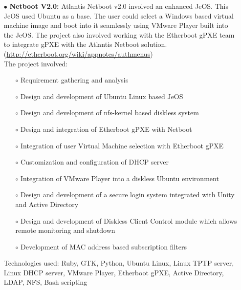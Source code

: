 \documentclass{scrartcl}
\begin{document}
\begin{cv}{
\href{http://www.develmj.com}{}
}
{\begin{itemize}
{\begin{itemize}
  \item[\footnotesize$\circ$] Customization of the JeOS to work with non-standard client devices
  \item[\footnotesize$\circ$] Design and development of a secure login into the Netboot JeOS
    integrated to use Unity credentials
  \end{itemize}}
  Technologies used: Python, GTK, Linux DHCP server, Knoppix Linux, Qemu,
  Bash scripting
\item[\footnotesize$\bullet$] \textbf{Netboot V2.0:} Atlantis Netboot v2.0 involved an enhanced JeOS. This JeOS
used Ubuntu as a base. The user could select a Windows based virtual
machine image and boot into it seamlessly using VMware Player built into the
JeOS. The project also involved working with the Etherboot gPXE team to
integrate gPXE with the Atlantis Netboot solution.
\\(\url{http://etherboot.org/wiki/appnotes/authmenus})\\
The project involved:
{\scriptsize
  \begin{itemize}
  \item[\footnotesize$\circ$] Requirement gathering and analysis
  \item[\footnotesize$\circ$] Design and development of Ubuntu Linux based JeOS
  \item[\footnotesize$\circ$] Design and development of nfs-kernel based diskless system
  \item[\footnotesize$\circ$] Design and integration of Etherboot gPXE with Netboot
  \item[\footnotesize$\circ$] Integration of user Virtual Machine selection with Etherboot gPXE
  \item[\footnotesize$\circ$] Customization and configuration of DHCP server
  \item[\footnotesize$\circ$] Integration of VMware Player into a diskless Ubuntu environment
  \item[\footnotesize$\circ$] Design and development of a secure login system integrated with Unity
    and Active Directory
  \item[\footnotesize$\circ$] Design and development of Diskless Client Control module which
    allows remote monitoring and shutdown
  \item[\footnotesize$\circ$] Development of MAC address based
    subscription filters
  \end{itemize}}
  Technologies used: Ruby, GTK, Python, Ubuntu Linux, Linux TPTP server,
  Linux DHCP server, VMware Player, Etherboot gPXE, Active Directory, LDAP,
  NFS, Bash scripting
\end{itemize}
}


\end{cv}
\end{document}
